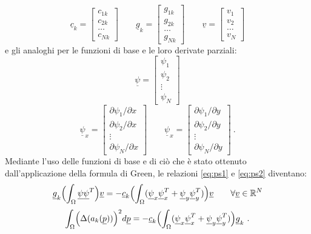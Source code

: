 \documentclass[a4paper,11pt,twoside,openright]{book}							%
\begin{document}
$$
\underline c_k =
\begin{bmatrix}
c_{1k} \\ c_{2k} \\ \hdots \\ c_{Nk}
\end{bmatrix}
\qquad
\underline g_k =
\begin{bmatrix}
g_{1k} \\ g_{2k} \\ \hdots \\ g_{Nk}
\end{bmatrix}
\qquad
\underline v =
\begin{bmatrix}
v_1 \\ v_2 \\ \hdots \\ v_N
\end{bmatrix} 
$$
e gli analoghi per le funzioni di base e le loro derivate parziali:
$$
\underline \psi =
\begin{bmatrix}
\psi_{1}  \\
\psi_{2}  \\
\vdots\\
\psi_{N}
\end{bmatrix}
$$
\begin{equation}
\underline \psi_x=  \begin{bmatrix}
\partial \psi_{1}/\partial x \\
\partial \psi_{2}/\partial x  \\
\vdots\\
\partial \psi_{N}/\partial x \end{bmatrix} 
\qquad
\underline \psi_x=  \begin{bmatrix}
\partial \psi_{1}/\partial y  \\
\partial \psi_{2}/\partial y  \\
\vdots\\
\partial \psi_{N}/\partial y\end{bmatrix} \ .
\end{equation}
Mediante l'uso delle funzioni di base e di ciò che è stato ottenuto dall'applicazione della formula di Green, le relazioni \ref{eq:ps1} e \ref{eq:ps2} diventano:
$$
\underline{g}_k \Bigl(\int_\Omega \underline \psi \underline \psi^T \Bigr)\underline{v}=
-\underline{c}_k \Bigl(\int_\Omega (\underline \psi_x \underline \psi_x^T + \underline \psi_y \underline \psi_y^T)\Bigr) \underline{v} \qquad \forall \underline{v} \in \mathbb{R}^N
$$
$$
\int_{\Omega} \Bigl( \Delta(  a_k(\underline p)  ) \Bigr)^2 d \underline p = -\underline{c}_k \Bigl(\int_\Omega (\underline \psi_x \underline \psi_x^T + \underline \psi_y \underline \psi_y^T) \Bigr)\underline{g}_k \ .
$$
\end{document}
